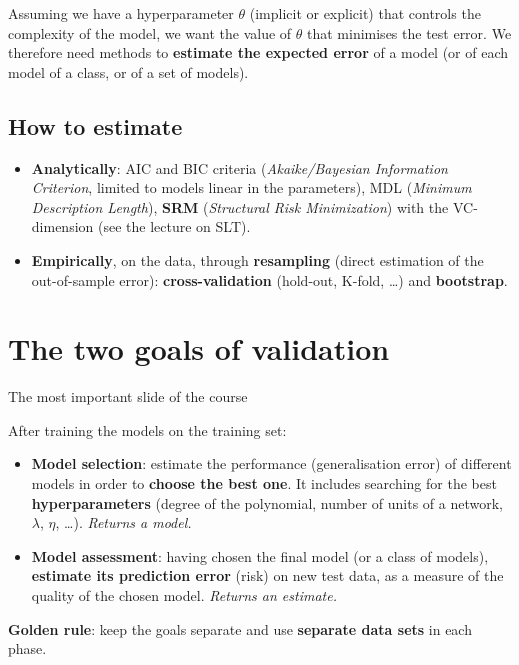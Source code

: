 Assuming we have a hyperparameter \(\theta\) (implicit or explicit)
that controls the complexity of the model, we want the value of
\(\theta\) that minimises the test error. We therefore need methods to
\textbf{estimate the expected error} of a model (or of each model of a
class, or of a set of models).

\subsection{How to estimate}\label{come-stimare}

\begin{itemize}
\tightlist
\item
  \textbf{Analytically}: AIC and BIC criteria (\emph{Akaike/Bayesian
  Information Criterion}, limited to models linear in the parameters),
  MDL (\emph{Minimum Description Length}), \textbf{SRM}
  (\emph{Structural Risk Minimization}) with the VC-dimension (see the
  lecture on SLT).
\item
  \textbf{Empirically}, on the data, through \textbf{resampling}
  (direct estimation of the out-of-sample error):
  \textbf{cross-validation} (hold-out, K-fold, \ldots) and
  \textbf{bootstrap}.
\end{itemize}

\section{The two goals of
validation}\label{i-due-obiettivi-della-validazione}

\begin{boxwarning}{The most important slide of the course}

After training the models on the training set:

\begin{itemize}
\tightlist
\item
  \textbf{Model selection}: estimate the performance (generalisation
  error) of different models in order to \textbf{choose the best one}.
  It includes searching for the best \textbf{hyperparameters} (degree
  of the polynomial, number of units of a network, \(\lambda\),
  \(\eta\), \ldots). \emph{Returns a model.}
\item
  \textbf{Model assessment}: having chosen the final model (or a class
  of models), \textbf{estimate its prediction error} (risk) on new test
  data, as a measure of the quality of the chosen model. \emph{Returns
  an estimate.}
\end{itemize}

\textbf{Golden rule}: keep the goals separate and use \textbf{separate
data sets} in each phase.

\end{boxwarning}

